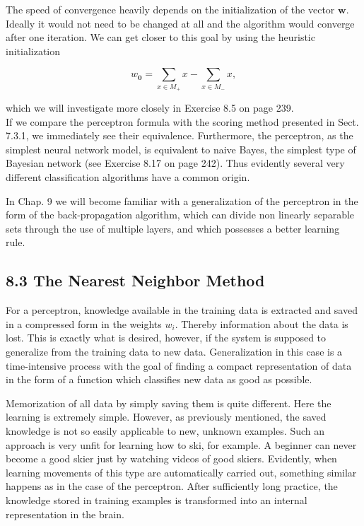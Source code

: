 \documentclass[10pt]{article}
\begin{document}
The speed of convergence heavily depends on the initialization of the vector $\boldsymbol{w}$. Ideally it would not need to be changed at all and the algorithm would converge after one iteration. We can get closer to this goal by using the heuristic initialization

$$
w_{\mathbf{0}}=\sum_{x \in M_{+}} x-\sum_{x \in M_{-}} x,
$$

which we will investigate more closely in Exercise 8.5 on page 239.\\
If we compare the perceptron formula with the scoring method presented in Sect. 7.3.1, we immediately see their equivalence. Furthermore, the perceptron, as the simplest neural network model, is equivalent to naive Bayes, the simplest type of Bayesian network (see Exercise 8.17 on page 242). Thus evidently several very different classification algorithms have a common origin.

In Chap. 9 we will become familiar with a generalization of the perceptron in the form of the back-propagation algorithm, which can divide non linearly separable sets through the use of multiple layers, and which possesses a better learning rule.

\subsection*{8.3 The Nearest Neighbor Method}
For a perceptron, knowledge available in the training data is extracted and saved in a compressed form in the weights $w_{i}$. Thereby information about the data is lost. This is exactly what is desired, however, if the system is supposed to generalize from the training data to new data. Generalization in this case is a time-intensive process with the goal of finding a compact representation of data in the form of a function which classifies new data as good as possible.

Memorization of all data by simply saving them is quite different. Here the learning is extremely simple. However, as previously mentioned, the saved knowledge is not so easily applicable to new, unknown examples. Such an approach is very unfit for learning how to ski, for example. A beginner can never become a good skier just by watching videos of good skiers. Evidently, when learning movements of this type are automatically carried out, something similar happens as in the case of the perceptron. After sufficiently long practice, the knowledge stored in training examples is transformed into an internal representation in the brain.
\end{document}
